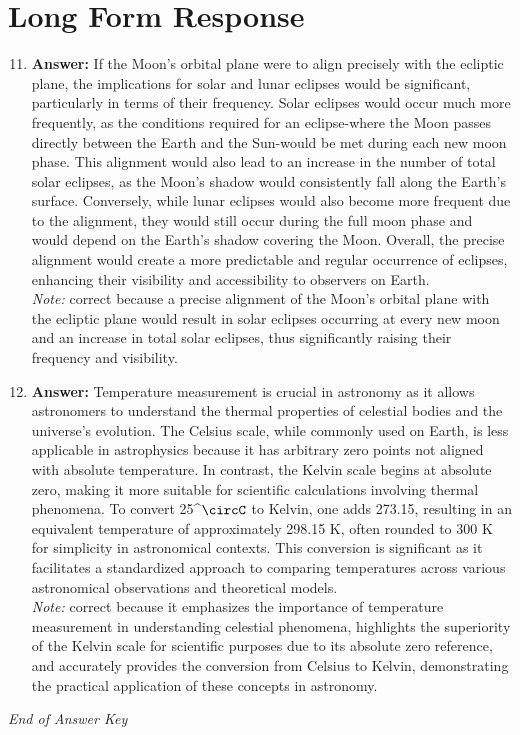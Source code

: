 \documentclass[12pt]{article}
\begin{document}
\section*{Long Form Response}
\begin{enumerate}[label=\arabic*.]
\setcounter{enumi}{10}
\item \textbf{Answer:} If the Moon's orbital plane were to align precisely with the ecliptic plane, the implications for solar and lunar eclipses would be significant, particularly in terms of their frequency. Solar eclipses would occur much more frequently, as the conditions required for an eclipse-where the Moon passes directly between the Earth and the Sun-would be met during each new moon phase. This alignment would also lead to an increase in the number of total solar eclipses, as the Moon's shadow would consistently fall along the Earth's surface. Conversely, while lunar eclipses would also become more frequent due to the alignment, they would still occur during the full moon phase and would depend on the Earth's shadow covering the Moon. Overall, the precise alignment would create a more predictable and regular occurrence of eclipses, enhancing their visibility and accessibility to observers on Earth.
\\ \textit{Note:} correct because a precise alignment of the Moon's orbital plane with the ecliptic plane would result in solar eclipses occurring at every new moon and an increase in total solar eclipses, thus significantly raising their frequency and visibility.
\item \textbf{Answer:} Temperature measurement is crucial in astronomy as it allows astronomers to understand the thermal properties of celestial bodies and the universe's evolution. The Celsius scale, while commonly used on Earth, is less applicable in astrophysics because it has arbitrary zero points not aligned with absolute temperature. In contrast, the Kelvin scale begins at absolute zero, making it more suitable for scientific calculations involving thermal phenomena. To convert 25^\ensuremath{\circC} to Kelvin, one adds 273.15, resulting in an equivalent temperature of approximately 298.15 K, often rounded to 300 K for simplicity in astronomical contexts. This conversion is significant as it facilitates a standardized approach to comparing temperatures across various astronomical observations and theoretical models.
\\ \textit{Note:} correct because it emphasizes the importance of temperature measurement in understanding celestial phenomena, highlights the superiority of the Kelvin scale for scientific purposes due to its absolute zero reference, and accurately provides the conversion from Celsius to Kelvin, demonstrating the practical application of these concepts in astronomy.
\end{enumerate}

\vfill
\noindent\textit{End of Answer Key}
\end{document}

